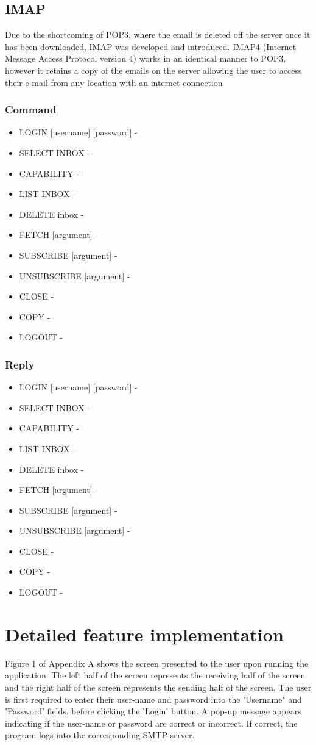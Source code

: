 \documentclass[11pt]{article}
\begin{document}
\begin{multicols}{2}
\subsection{IMAP}
Due to the shortcoming of POP3, where the email is deleted off the server once it has been downloaded, IMAP was developed and introduced. IMAP4 (Internet Message Access Protocol version 4) works in an identical manner to POP3, however it retains a copy of the emails on the server allowing the user to access their e-mail from any location with an internet connection
\subsubsection{Command}
\begin{itemize}
  \item LOGIN [username] [password] - 
  \item SELECT INBOX - 
  \item CAPABILITY - 
  \item LIST INBOX - 
  \item DELETE inbox - 
  \item FETCH [argument] - 
  \item SUBSCRIBE [argument] - 
  \item UNSUBSCRIBE [argument] - 
  \item CLOSE - 
  \item COPY - 
  \item LOGOUT - 
\end{itemize}
\subsubsection{Reply}
\begin{itemize}
  \item LOGIN [username] [password] - 
  \item SELECT INBOX - 
  \item CAPABILITY - 
  \item LIST INBOX - 
  \item DELETE inbox - 
  \item FETCH [argument] - 
  \item SUBSCRIBE [argument] - 
  \item UNSUBSCRIBE [argument] - 
  \item CLOSE - 
  \item COPY - 
  \item LOGOUT - 
\end{itemize}
\section{Detailed feature implementation}
Figure 1 of Appendix A shows the screen presented to the user upon running the application. The left half of the screen represents the receiving half of the screen and the right half of the screen represents the sending half of the screen. The user is first required to enter their user-name and password into the 'Username" and 'Password' fields, before clicking the 'Login' button. A pop-up message appears indicating if the user-name or password are correct or incorrect. If correct, the program logs into the corresponding SMTP server.

\end{multicols}
\end{document}
